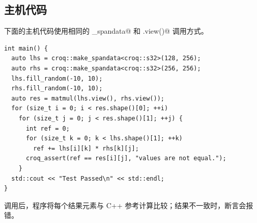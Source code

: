 \subsection*{主机代码}

下面的主机代码使用相同的 \co@make_spandata@ 和 \co@.view()@ 调用方式。

\begin{lstlisting}[language=croqtile,caption={主机代码}]
int main() {
  auto lhs = croq::make_spandata<croq::s32>(128, 256);
  auto rhs = croq::make_spandata<croq::s32>(256, 256);
  lhs.fill_random(-10, 10);
  rhs.fill_random(-10, 10);
  auto res = matmul(lhs.view(), rhs.view());
  for (size_t i = 0; i < res.shape()[0]; ++i)
    for (size_t j = 0; j < res.shape()[1]; ++j) {
      int ref = 0;
      for (size_t k = 0; k < lhs.shape()[1]; ++k)
        ref += lhs[i][k] * rhs[k][j];
      croq_assert(ref == res[i][j], "values are not equal.");
    }
  std::cout << "Test Passed\n" << std::endl;
}
\end{lstlisting}

调用后，程序将每个结果元素与 C++ 参考计算比较；结果不一致时，断言会报错。
